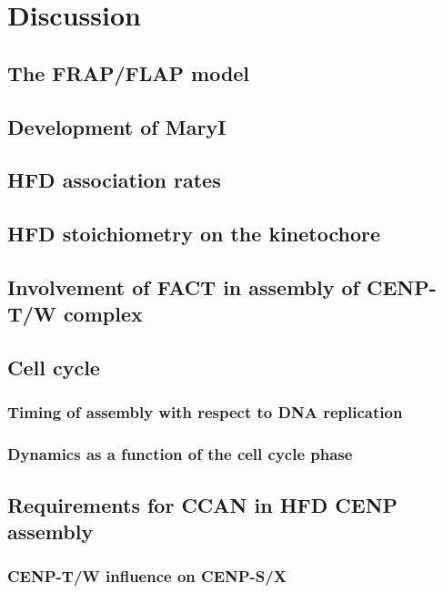\section{Discussion}
  \subsection{The FRAP/FLAP model}
  \subsection{Development of MaryI}
  \subsection{HFD association rates}
  \subsection{HFD stoichiometry on the kinetochore}
  \subsection{Involvement of FACT in assembly of CENP-T/W complex}
  \subsection{Cell cycle}
    \subsubsection{Timing of assembly with respect to DNA replication}
    \subsubsection{Dynamics as a function of the cell cycle phase}
  \subsection{Requirements for CCAN in HFD CENP assembly}
    \subsubsection{CENP-T/W influence on CENP-S/X}

